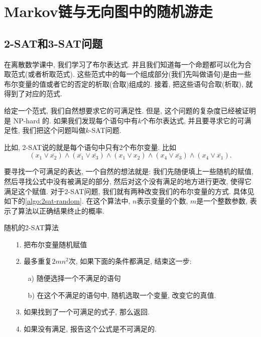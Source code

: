 \section{Markov链与无向图中的随机游走}

\subsection{2-SAT和3-SAT问题}

在离散数学课中, 我们学习了布尔表达式. 并且我们知道每一个命题都可以化为合取范式(或者析取范式). 这些范式中的每一个组成部分(我们先叫做语句)是由一些布尔变量的值或者它的否定的析取(合取)组成的. 接着, 把这些语句合取(析取), 就得到了对应的范式. 

给定一个范式, 我们自然想要求它的可满足性. 但是, 这个问题的复杂度已经被证明是 NP-hard 的. 如果我们发现每个语句中有$k$个布尔表达式, 并且要寻求它的可满足性, 我们把这个问题叫做$k$-SAT问题. 

比如, 2-SAT说的就是每个语句中只有2个布尔变量. 比如
$$\left(x_1 \vee \overline{x_2}\right) \wedge\left(\overline{x_1} \vee \overline{x_3}\right) \wedge\left(x_1 \vee x_2\right) \wedge\left(x_4 \vee \overline{x_3}\right) \wedge\left(x_4 \vee \overline{x_1}\right).$$

要寻找一个可满足的表达, 一个自然的想法就是: 我们先随便填上一些随机的赋值, 然后寻找公式中没有被满足的部分, 然后对这个没有满足的地方进行更改, 使得它满足这个赋值. 对于2-SAT问题, 我们就有两种改变我们的布尔变量的方式. 具体见如下的\cref{algo:2sat-random}. 在这个算法中, $n$表示变量的个数, $m$是一个整数参数, 表示了算法以正确结果终止的概率. 

\begin{algorithm}
    \caption{随机的2-SAT算法}
    \label{algo:2sat-random}

    \begin{itemize}
        \item [1.] 把布尔变量随机赋值
        \item [2.] 最多重复$2mn^2$次, 如果下面的条件都满足, 结束这一步: 
        \begin{itemize}
            \item [a)]随便选择一个不满足的语句
            \item [b)]在这个不满足的语句中, 随机选取一个变量, 改变它的真值. 
        \end{itemize}
        \item [3.] 如果找到了一个可满足的式子, 那么返回. 
        \item [4.] 如果没有满足, 报告这个公式是不可满足的. 
    \end{itemize}


\end{algorithm}

